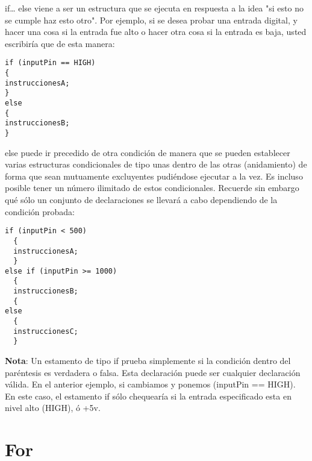 if… else viene a ser un estructura que se ejecuta en respuesta a la idea "si esto no se cumple haz esto otro". Por ejemplo, si se desea probar una entrada digital, y hacer una cosa si la entrada fue alto o hacer otra cosa si la entrada es baja, usted escribiría que de esta manera:
\begin{lstlisting}
if (inputPin == HIGH)
{
instruccionesA;    
}
else   
{
instruccionesB;
}
\end{lstlisting}
else puede ir precedido de otra condición de manera que se pueden establecer varias estructuras condicionales de tipo unas dentro de las otras (anidamiento) de forma que sean mutuamente excluyentes pudiéndose ejecutar a la vez. Es incluso posible tener un número ilimitado de estos condicionales. Recuerde sin embargo qué sólo un conjunto de declaraciones se llevará a cabo dependiendo de la condición probada:
\begin{lstlisting}
if (inputPin < 500)
  {
  instruccionesA;
  }
else if (inputPin >= 1000)
  {
  instruccionesB;
  {
else   
  {
  instruccionesC;
  }
\end{lstlisting}
\textbf{Nota}: Un estamento de tipo if prueba simplemente si la condición dentro del paréntesis es verdadera o falsa. Esta declaración puede ser cualquier declaración válida. En el anterior ejemplo, si cambiamos y ponemos (inputPin == HIGH). En este caso, el estamento if sólo chequearía si la entrada especificado esta en nivel alto (HIGH), ó +5v.
\section{For}

